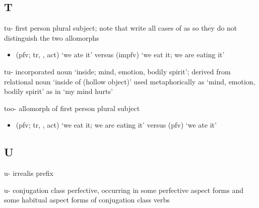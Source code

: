 \subsection{T}\label{sec:alphalist-t}
\begin{morphdesc}[resume*=alphalist]
\item[tu-]
	first person plural subject;
	note that \cite{story-naish:1973} write all cases of  as 
		so they do not distinguish the two allomorphs
	\begin{itemize}
	\item	{} (pfv; tr, ,  act) ‘we ate it’\newline
		versus  (impfv) ‘we eat it; we are eating it’
	\end{itemize}

\item[tu-]
	incorporated noun ‘inside; mind, emotion, bodily spirit’;
	derived from relational noun  ‘inside of (hollow object)’
	used metaphorically as ‘mind, emotion, bodily spirit’ as in  ‘my mind hurts’

\item[too-]
	allomorph of first person plural subject 
	\begin{itemize}
	\item	{} (pfv; tr, ,  act) ‘we eat it; we are eating it’\newline
		versus  (pfv) ‘we ate it’
	\end{itemize}
\end{morphdesc}

\subsection{U}\label{sec:alphalist-u}
\begin{morphdesc}[resume*=alphalist]
\item[u-]\label{m:u-irr}
	irrealis prefix

\item[u-]\label{m:u-pfv}
	 conjugation class perfective,
	occurring in some perfective aspect forms and some habitual aspect forms of
	 conjugation class verbs
\end{morphdesc}

